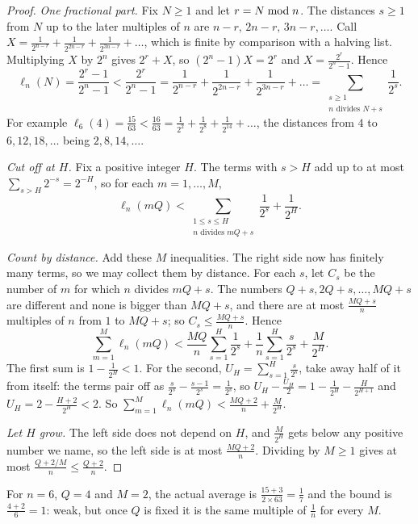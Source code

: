 \documentclass[10pt]{article}
\theoremstyle{plain}
\theoremstyle{definition}
\theoremstyle{remark}
\newcommand{\lft}{\ell}
\newcommand{\rmod}{\mskip5mu\mathrm{mod}\mskip5mu}
\begin{document}
\begin{proof}
\emph{One fractional part.} Fix $N\ge1$ and let $r=N\rmod n$. The distances $s\ge1$
from $N$ up to the later multiples of $n$ are $n-r,\,2n-r,\,3n-r,\dots$. Call
$X=\tfrac1{2^{n-r}}+\tfrac1{2^{2n-r}}+\tfrac1{2^{3n-r}}+\dots$, which is finite
by comparison with a halving list. Multiplying $X$ by $2^n$ gives $2^r+X$, so
$(2^n-1)X=2^r$ and $X=\tfrac{2^r}{2^n-1}$. Hence
\[
 \lft_n(N)=\frac{2^r-1}{2^n-1}<\frac{2^r}{2^n-1}
 =\frac1{2^{n-r}}+\frac1{2^{2n-r}}+\frac1{2^{3n-r}}+\dots
 =\sum_{\substack{s\ge1\\n\text{ divides }N+s}}\frac1{2^s} .
\]
For example $\lft_6(4)=\tfrac{15}{63}<\tfrac{16}{63}=\tfrac1{2^2}+\tfrac1{2^8}+\tfrac1{2^{14}}+\dots$,
the distances from $4$ to $6,12,18,\dots$ being $2,8,14,\dots$.

\emph{Cut off at $H$.} Fix a positive integer $H$. The terms with $s>H$ add up
to at most $\sum_{s>H}2^{-s}=2^{-H}$, so for each $m=1,\dots,M$,
\[
 \lft_n(mQ)<\sum_{\substack{1\le s\le H\\n\text{ divides }mQ+s}}\frac1{2^s}+\frac1{2^H}.
\]

\emph{Count by distance.} Add these $M$ inequalities. The right side now has
finitely many terms, so we may collect them by distance. For each $s$, let
$C_s$ be the number of $m$ for which $n$ divides $mQ+s$. The numbers
$Q+s,2Q+s,\dots,MQ+s$ are different and none is bigger than $MQ+s$, and there
are at most $\tfrac{MQ+s}n$ multiples of $n$ from $1$ to $MQ+s$; so
$C_s\le\tfrac{MQ+s}n$. Hence
\[
 \sum_{m=1}^{M}\lft_n(mQ)<\frac{MQ}n\sum_{s=1}^{H}\frac1{2^s}+\frac1n\sum_{s=1}^{H}\frac s{2^s}+\frac M{2^H}.
\]
The first sum is $1-\tfrac1{2^H}<1$. For the second, $U_H=\sum_{s=1}^{H}\tfrac s{2^s}$,
take away half of it from itself: the terms pair off as
$\tfrac s{2^s}-\tfrac{s-1}{2^s}=\tfrac1{2^s}$, so
$U_H-\tfrac{U_H}2=1-\tfrac1{2^H}-\tfrac H{2^{H+1}}$ and
$U_H=2-\tfrac{H+2}{2^H}<2$. So
$\sum_{m=1}^{M}\lft_n(mQ)<\tfrac{MQ+2}n+\tfrac M{2^H}$.

\emph{Let $H$ grow.} The left side does not depend on $H$, and
$\tfrac M{2^H}$ gets below any positive number we name, so the left side is at
most $\tfrac{MQ+2}n$. Dividing by $M\ge1$ gives at most
$\tfrac{Q+2/M}n\le\tfrac{Q+2}n$.
\end{proof}

For $n=6$, $Q=4$ and $M=2$, the actual average is
$\tfrac{15+3}{2\times63}=\tfrac17$ and the bound is $\tfrac{4+2}6=1$: weak, but
once $Q$ is fixed it is the same multiple of $\tfrac1n$ for every $M$.
\end{document}
